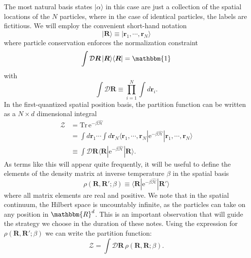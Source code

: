 \documentclass[prb,aps,amssym,nofootinbib,floatfix,notitlepage]{revtex4-1}
\renewcommand{\vec}[1]{\boldsymbol{#1}}
\newcommand{\e}[1]{\mathrm{e}^{#1}}
\newcommand{\R}{\vec{R}}
\begin{document}
The most natural basis states $|\alpha\rangle$ in this case are just a
collection of the spatial locations of the $N$ particles, where in the case of
identical particles, the labels are fictitious. We will employ the convenient
short-hand notation 
%
\begin{equation}
    |\R\rangle \equiv |\vec{r}_1, \cdots, \vec{r}_N \rangle
\end{equation}
%
where particle conservation enforces the normalization constraint
%
\begin{equation}
\int \mathcal{D}\R\, |\R\rangle \langle \R | = \mathbbm{1}
\label{eq:Norm}
\end{equation}
%
with 
%
\begin{equation}
    \int\mathcal{D} \R  \equiv \prod_{i=1}^N \int d \vec{r}_i.
\end{equation}
%
In the first-quantized spatial position basis, the partition function can be
written as a $N \times d$ dimensional integral
%
\begin{align}
    \mathcal{Z} &= \mathrm{Tr}\, \e{-\beta \hat{\mathcal{H}}}  \nonumber \\
                &= \int d\vec{r}_1 \cdots \int d\vec{r}_N \langle \vec{r}_1,
    \cdots, \vec{r}_N | \e{-\beta \hat{\mathcal{H}}}| \vec{r}_1, \cdots,
    \vec{r}_N \rangle \nonumber \\
&\equiv \int \mathcal{D} \R \langle \R | \e{-\beta \hat{\mathcal{H}}} | \R
    \rangle.
\label{eq:ZDR}
\end{align}
%
As terms like this will appear quite frequently, it will be useful to define
the elements of the density matrix at inverse temperature $\beta$ in the
spatial basis
%
\begin{equation}
    \rho(\R, \R'; \beta) \equiv \langle \R | \e{-\beta \hat{\mathcal{H}}} |
    \R'\rangle
\end{equation}
%
where all matrix elements are real and positive. We note that in the spatial
continuum, the Hilbert space is uncountably infinite, as the particles can take
on any position in $\mathbbm{R}^d$. This is an important observation that will
guide the strategy we choose in the duration of these notes. Using the
expression for $\rho(\R,\R';\beta)$ we can write the partition function:
%
\begin{equation}
\mathcal{Z} = \int \mathcal{D}\R \, \rho(\R,\R;\beta).
\label{eq:Zrho}
\end{equation}
%
\end{document}
